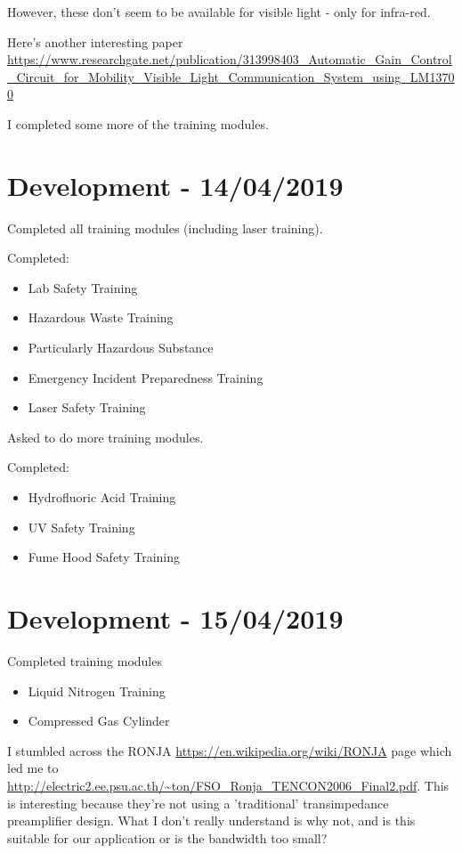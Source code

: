 However, these don't seem to be available for visible light - only for
infra-red.

Here's another interesting paper \url{https://www.researchgate.net/publication/313998403_Automatic_Gain_Control_Circuit_for_Mobility_Visible_Light_Communication_System_using_LM13700}

I completed some more of the training modules.



\section{Development - 14/04/2019}
Completed all training modules (including laser training).

Completed:
\begin{itemize}
\item{Lab Safety Training}
\item{Hazardous Waste Training}
\item{Particularly Hazardous Substance}
\item{Emergency Incident Preparedness Training}
\item{Laser Safety Training}
\end{itemize}

Asked to do more training modules.

Completed:
\begin{itemize}
\item{Hydrofluoric Acid Training}
\item{UV Safety Training}
\item{Fume Hood Safety Training}
\end{itemize}

\section{Development - 15/04/2019}
Completed training modules

\begin{itemize}
\item{Liquid Nitrogen Training}
\item{Compressed Gas Cylinder}
\end{itemize}

I stumbled across the RONJA \url{https://en.wikipedia.org/wiki/RONJA} page
which led me to \url{http://electric2.ee.psu.ac.th/~ton/FSO_Ronja_TENCON2006_Final2.pdf}.
This is interesting because they're not using a 'traditional' transimpedance
preamplifier design. What I don't really understand is why not, and is this
suitable for our application or is the bandwidth too small?

